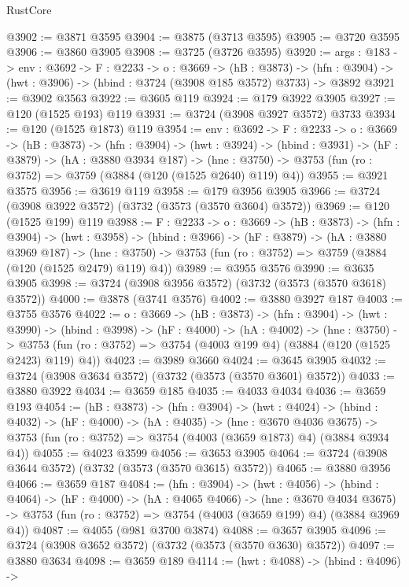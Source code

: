 \begin{lexlean}{RustCore}
\begin{coremodule}
@3902 := @3871 @3595
@3904 := @3875 (@3713 @3595)
@3905 := @3720 @3595
@3906 := @3860 @3905
@3908 := @3725 (@3726 @3595)
@3920 := {args : @183} ->
  {env : @3692} ->
  {F : @2233} ->
  {o : @3669} ->
  (hB : @3873) ->
  (hfn : @3904) -> (hwt : @3906) -> (hbind : @3724 (@3908 @185 @3572) @3733) -> @3892
@3921 := @3902 @3563
@3922 := @3605 @119
@3924 := @179 @3922 @3905
@3927 := @120 (@1525 @193) @119
@3931 := @3724 (@3908 @3927 @3572) @3733
@3934 := @120 (@1525 @1873) @119
@3954 := {env : @3692} ->
  {F : @2233} ->
  {o : @3669} ->
  (hB : @3873) ->
  (hfn : @3904) ->
  (hwt : @3924) ->
  (hbind : @3931) ->
  (hF : @3879) ->
  (hA : @3880 @3934 @187) ->
  (hne : @3750) -> @3753 (fun (ro : @3752) => @3759 (@3884 (@120 (@1525 @2640) @119) @4))
@3955 := @3921 @3575
@3956 := @3619 @119
@3958 := @179 @3956 @3905
@3966 := @3724 (@3908 @3922 @3572) (@3732 (@3573 (@3570 @3604) @3572))
@3969 := @120 (@1525 @199) @119
@3988 := {F : @2233} ->
  {o : @3669} ->
  (hB : @3873) ->
  (hfn : @3904) ->
  (hwt : @3958) ->
  (hbind : @3966) ->
  (hF : @3879) ->
  (hA : @3880 @3969 @187) ->
  (hne : @3750) -> @3753 (fun (ro : @3752) => @3759 (@3884 (@120 (@1525 @2479) @119) @4))
@3989 := @3955 @3576
@3990 := @3635 @3905
@3998 := @3724 (@3908 @3956 @3572) (@3732 (@3573 (@3570 @3618) @3572))
@4000 := @3878 (@3741 @3576)
@4002 := @3880 @3927 @187
@4003 := @3755 @3576
@4022 := {o : @3669} ->
  (hB : @3873) ->
  (hfn : @3904) ->
  (hwt : @3990) ->
  (hbind : @3998) ->
  (hF : @4000) ->
  (hA : @4002) ->
  (hne : @3750) ->
  @3753 (fun (ro : @3752) => @3754 (@4003 @199 @4) (@3884 (@120 (@1525 @2423) @119) @4))
@4023 := @3989 @3660
@4024 := @3645 @3905
@4032 := @3724 (@3908 @3634 @3572) (@3732 (@3573 (@3570 @3601) @3572))
@4033 := @3880 @3922
@4034 := @3659 @185
@4035 := @4033 @4034
@4036 := @3659 @193
@4054 := (hB : @3873) ->
  (hfn : @3904) ->
  (hwt : @4024) ->
  (hbind : @4032) ->
  (hF : @4000) ->
  (hA : @4035) ->
  (hne : @3670 @4036 @3675) ->
  @3753 (fun (ro : @3752) => @3754 (@4003 (@3659 @1873) @4) (@3884 @3934 @4))
@4055 := @4023 @3599
@4056 := @3653 @3905
@4064 := @3724 (@3908 @3644 @3572) (@3732 (@3573 (@3570 @3615) @3572))
@4065 := @3880 @3956
@4066 := @3659 @187
@4084 := (hfn : @3904) ->
  (hwt : @4056) ->
  (hbind : @4064) ->
  (hF : @4000) ->
  (hA : @4065 @4066) ->
  (hne : @3670 @4034 @3675) ->
  @3753 (fun (ro : @3752) => @3754 (@4003 (@3659 @199) @4) (@3884 @3969 @4))
@4087 := @4055 (@981 @3700 @3874)
@4088 := @3657 @3905
@4096 := @3724 (@3908 @3652 @3572) (@3732 (@3573 (@3570 @3630) @3572))
@4097 := @3880 @3634
@4098 := @3659 @189
@4114 := (hwt : @4088) ->
  (hbind : @4096) ->

\end{coremodule}
\end{lexlean}
